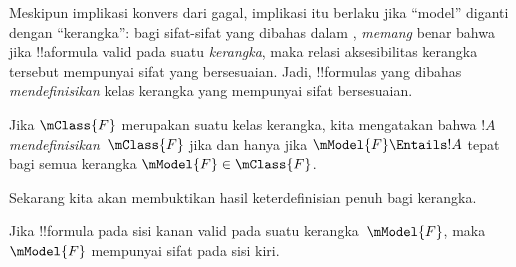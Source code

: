 \documentclass[../../../include/open-logic-section]{subfiles}
\begin{document}


Meskipun implikasi konvers dari  gagal, implikasi
itu berlaku jika ``model'' diganti dengan ``kerangka'': bagi sifat-sifat yang
dibahas dalam , \emph{memang} benar bahwa jika
!!a{formula} valid pada suatu \emph{kerangka}, maka relasi aksesibilitas
kerangka tersebut mempunyai sifat yang bersesuaian. Jadi, !!{formula}s yang
dibahas \emph{mendefinisikan} kelas kerangka yang mempunyai sifat
bersesuaian.

\begin{defn}
  Jika $\mClass{F}$ merupakan suatu kelas kerangka, kita mengatakan bahwa
  $!A$ \emph{mendefinisikan}~$\mClass{F}$ jika dan hanya jika
  $\mModel{F}\Entails !A$ tepat bagi semua kerangka
  $\mModel{F}\in\mClass{F}$.
\end{defn}

Sekarang kita akan membuktikan hasil keterdefinisian penuh bagi kerangka.

\begin{thm}
Jika !!{formula} pada sisi kanan  valid pada suatu
kerangka~$\mModel{F}$, maka $\mModel{F}$ mempunyai sifat pada sisi kiri.
\end{thm}
\end{document}
